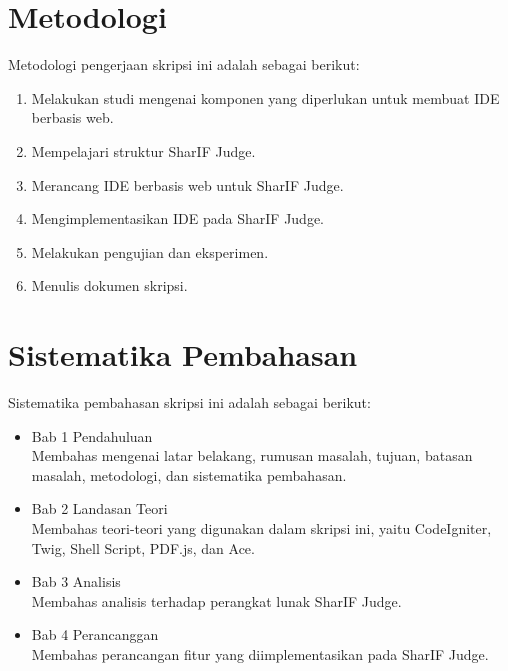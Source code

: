 \section{Metodologi}
\label{sec:metlit}
Metodologi pengerjaan skripsi ini adalah sebagai berikut:
\begin{enumerate}
	\item Melakukan studi mengenai komponen yang diperlukan untuk membuat IDE berbasis web.
	\item Mempelajari struktur SharIF Judge.
	\item Merancang IDE berbasis web untuk SharIF Judge.
	\item Mengimplementasikan IDE pada SharIF Judge.
	\item Melakukan pengujian dan eksperimen.
	\item Menulis dokumen skripsi.
\end{enumerate}

\section{Sistematika Pembahasan}
\label{sec:sispem}
Sistematika pembahasan skripsi ini adalah sebagai berikut:
\begin{itemize}
	\item Bab 1 Pendahuluan \\ Membahas mengenai latar belakang, rumusan masalah, tujuan, batasan masalah, metodologi, dan sistematika pembahasan.
	\item Bab 2 Landasan Teori \\ Membahas teori-teori yang digunakan dalam skripsi ini, yaitu CodeIgniter, Twig, Shell Script, PDF.js, dan Ace.
	\item Bab 3 Analisis \\ Membahas analisis terhadap perangkat lunak SharIF Judge.
	\item Bab 4 Perancanggan \\ Membahas perancangan fitur yang diimplementasikan pada SharIF Judge.
\end{itemize}
